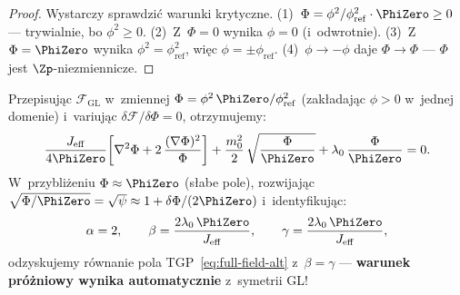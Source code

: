 \begin{proof}
Wystarczy sprawdzi\'c warunki krytyczne.
(1)~$\Phi = \phi^2/\phi_{\mathrm{ref}}^2 \cdot \PhiZero \geq 0$
--- trywialnie, bo $\phi^2 \geq 0$.
(2)~Z~$\Phi = 0$ wynika $\phi = 0$ (i~odwrotnie).
(3)~Z~$\Phi = \PhiZero$ wynika $\phi^2 = \phi_{\mathrm{ref}}^2$,
wi\k{e}c $\phi = \pm\phi_{\mathrm{ref}}$.
(4)~$\phi \to -\phi$ daje $\Phi \to \Phi$ ---
$\Phi$ jest $\Zp$-niezmiennicze.
\end{proof}

\begin{proposition}\label{prop:field-from-GL}
Przepisuj\k{a}c $\mathcal{F}_{\mathrm{GL}}$ w~zmiennej
$\Phi = \phi^2\,\PhiZero/\phi_{\mathrm{ref}}^2$
(zak\l{}adaj\k{a}c $\phi > 0$ w~jednej domenie) i~variuj\k{a}c
$\delta\mathcal{F}/\delta\Phi = 0$, otrzymujemy:
\begin{equation}\label{eq:GL-to-TGP}
  \frac{J_{\mathrm{eff}}}{4\PhiZero}\!\left[
    \nabla^2\Phi + 2\,\frac{(\nabla\Phi)^2}{\Phi}
  \right]
  + \frac{m_0^2}{2}\,\sqrt{\frac{\Phi}{\PhiZero}}
  + \lambda_0\,\frac{\Phi}{\PhiZero}
  = 0.
\end{equation}
W~przybli\.zeniu $\Phi \approx \PhiZero$ (s\l{}abe pole),
rozwijaj\k{a}c $\sqrt{\Phi/\PhiZero}
= \sqrt\psi \approx 1 + \delta\Phi/(2\PhiZero)$
i~identyfikuj\k{a}c:
\begin{equation}\label{eq:GL-identification}
  \alpha = 2, \qquad
  \beta = \frac{2\lambda_0\,\PhiZero}{J_{\mathrm{eff}}}, \qquad
  \gamma = \frac{2\lambda_0\,\PhiZero}{J_{\mathrm{eff}}},
\end{equation}
odzyskujemy r\'ownanie pola TGP~\eqref{eq:full-field-alt}
z~$\beta = \gamma$ --- \textbf{warunek pr\'o\.zniowy wynika
automatycznie} z~symetrii GL!
\end{proposition}

